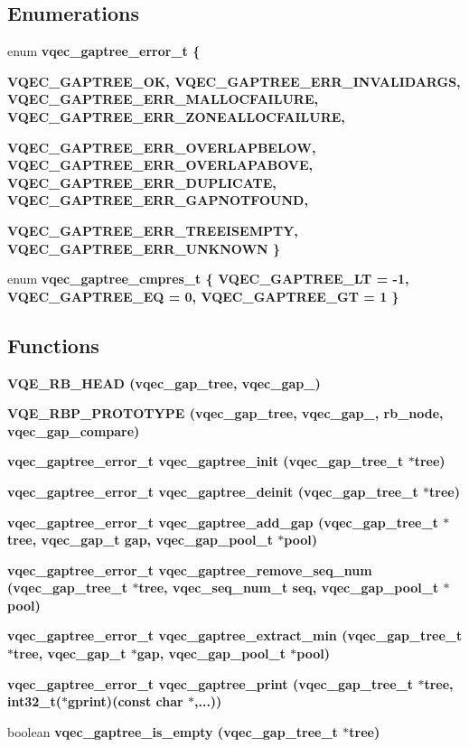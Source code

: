 \subsection*{Enumerations}
\begin{CompactItemize}
\item 
enum \bf{vqec\_\-gaptree\_\-error\_\-t} \{ \par
\bf{VQEC\_\-GAPTREE\_\-OK}, 
\bf{VQEC\_\-GAPTREE\_\-ERR\_\-INVALIDARGS}, 
\bf{VQEC\_\-GAPTREE\_\-ERR\_\-MALLOCFAILURE}, 
\bf{VQEC\_\-GAPTREE\_\-ERR\_\-ZONEALLOCFAILURE}, 
\par
\bf{VQEC\_\-GAPTREE\_\-ERR\_\-OVERLAPBELOW}, 
\bf{VQEC\_\-GAPTREE\_\-ERR\_\-OVERLAPABOVE}, 
\bf{VQEC\_\-GAPTREE\_\-ERR\_\-DUPLICATE}, 
\bf{VQEC\_\-GAPTREE\_\-ERR\_\-GAPNOTFOUND}, 
\par
\bf{VQEC\_\-GAPTREE\_\-ERR\_\-TREEISEMPTY}, 
\bf{VQEC\_\-GAPTREE\_\-ERR\_\-UNKNOWN}
 \}
\item 
enum \bf{vqec\_\-gaptree\_\-cmpres\_\-t} \{ \bf{VQEC\_\-GAPTREE\_\-LT} =  -1, 
\bf{VQEC\_\-GAPTREE\_\-EQ} =  0, 
\bf{VQEC\_\-GAPTREE\_\-GT} =  1
 \}
\end{CompactItemize}
\subsection*{Functions}
\begin{CompactItemize}
\item 
\bf{VQE\_\-RB\_\-HEAD} (vqec\_\-gap\_\-tree, \bf{vqec\_\-gap\_\-})
\item 
\bf{VQE\_\-RBP\_\-PROTOTYPE} (vqec\_\-gap\_\-tree, \bf{vqec\_\-gap\_\-}, rb\_\-node, vqec\_\-gap\_\-compare)
\item 
\bf{vqec\_\-gaptree\_\-error\_\-t} \bf{vqec\_\-gaptree\_\-init} (\bf{vqec\_\-gap\_\-tree\_\-t} $\ast$tree)
\item 
\bf{vqec\_\-gaptree\_\-error\_\-t} \bf{vqec\_\-gaptree\_\-deinit} (\bf{vqec\_\-gap\_\-tree\_\-t} $\ast$tree)
\item 
\bf{vqec\_\-gaptree\_\-error\_\-t} \bf{vqec\_\-gaptree\_\-add\_\-gap} (\bf{vqec\_\-gap\_\-tree\_\-t} $\ast$tree, \bf{vqec\_\-gap\_\-t} gap, \bf{vqec\_\-gap\_\-pool\_\-t} $\ast$pool)
\item 
\bf{vqec\_\-gaptree\_\-error\_\-t} \bf{vqec\_\-gaptree\_\-remove\_\-seq\_\-num} (\bf{vqec\_\-gap\_\-tree\_\-t} $\ast$tree, vqec\_\-seq\_\-num\_\-t seq, \bf{vqec\_\-gap\_\-pool\_\-t} $\ast$pool)
\item 
\bf{vqec\_\-gaptree\_\-error\_\-t} \bf{vqec\_\-gaptree\_\-extract\_\-min} (\bf{vqec\_\-gap\_\-tree\_\-t} $\ast$tree, \bf{vqec\_\-gap\_\-t} $\ast$gap, \bf{vqec\_\-gap\_\-pool\_\-t} $\ast$pool)
\item 
\bf{vqec\_\-gaptree\_\-error\_\-t} \bf{vqec\_\-gaptree\_\-print} (\bf{vqec\_\-gap\_\-tree\_\-t} $\ast$tree, int32\_\-t($\ast$gprint)(const char $\ast$,...))
\item 
boolean \bf{vqec\_\-gaptree\_\-is\_\-empty} (\bf{vqec\_\-gap\_\-tree\_\-t} $\ast$tree)
\end{CompactItemize}


